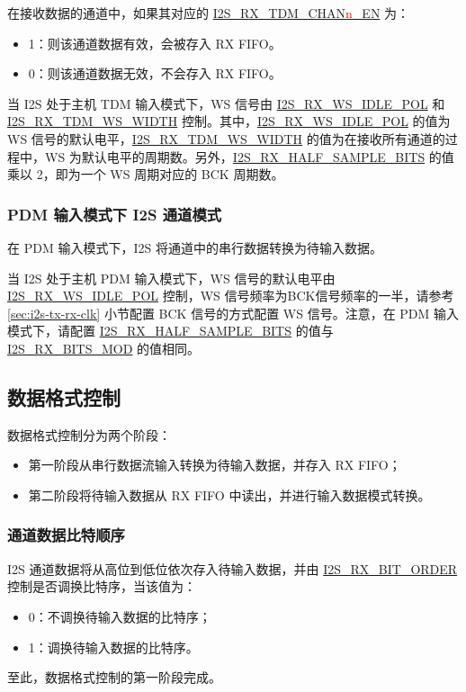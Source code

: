 \documentclass[main\_\_CN.tex]{subfiles}
\begin{document}
在接收数据的通道中，如果其对应的 \hyperref[fielddesc:I2STXTDMCHAN0EN]{I2S\_RX\_TDM\_CHAN{\textcolor{red}{n}}\_EN} 为：
\begin{itemize}
    \item 1：则该通道数据有效，会被存入 RX FIFO。
    \item 0：则该通道数据无效，不会存入 RX FIFO。
\end{itemize}
当 I2S 处于主机 TDM 输入模式下，WS 信号由 \hyperref[fielddesc:I2SRXWSIDLEPOL]{I2S\_RX\_WS\_IDLE\_POL} 和 \hyperref[fielddesc:I2SRXTDMWSWIDTH]{I2S\_RX\_TDM\_WS\_WIDTH} 控制。其中，\hyperref[fielddesc:I2SRXWSIDLEPOL]{I2S\_RX\_WS\_IDLE\_POL} 的值为 WS 信号的默认电平，\hyperref[fielddesc:I2SRXTDMWSWIDTH]{I2S\_RX\_TDM\_WS\_WIDTH} 的值为在接收所有通道的过程中，WS 为默认电平的周期数。另外，\hyperref[fielddesc:I2SRXHALFSAMPLEBITS]{I2S\_RX\_HALF\_SAMPLE\_BITS} 的值乘以 2，即为一个 WS 周期对应的 BCK 周期数。

\subsubsection{PDM 输入模式下 I2S 通道模式} 
在 PDM 输入模式下，I2S 将通道中的串行数据转换为待输入数据。

当 I2S 处于主机 PDM 输入模式下，WS 信号的默认电平由 \hyperref[fielddesc:I2SRXWSIDLEPOL]{I2S\_RX\_WS\_IDLE\_POL} 控制，WS 信号频率为BCK信号频率的一半，请参考 \ref{sec:i2s-tx-rx-clk} 小节配置 BCK 信号的方式配置 WS 信号。注意，在 PDM 输入模式下，请配置 \hyperref[fielddesc:I2SRXHALFSAMPLEBITS]{I2S\_RX\_HALF\_SAMPLE\_BITS} 的值与 \hyperref[fielddesc:I2SRXBITSMOD]{I2S\_RX\_BITS\_MOD} 的值相同。

\subsection{数据格式控制}
数据格式控制分为两个阶段：
\begin{itemize}
    \item 第一阶段从串行数据流输入转换为待输入数据，并存入 RX FIFO；
    \item 第二阶段将待输入数据从 RX FIFO 中读出，并进行输入数据模式转换。
\end{itemize}

\subsubsection{通道数据比特顺序} 
\chipname{} I2S 通道数据将从高位到低位依次存入待输入数据，并由 \hyperref[fielddesc:I2SRXBITORDER]{I2S\_RX\_BIT\_ORDER} 控制是否调换比特序，当该值为：
\begin{itemize}
\item 0：不调换待输入数据的比特序；
\item 1：调换待输入数据的比特序。
\end{itemize}
至此，数据格式控制的第一阶段完成。
\end{document}
